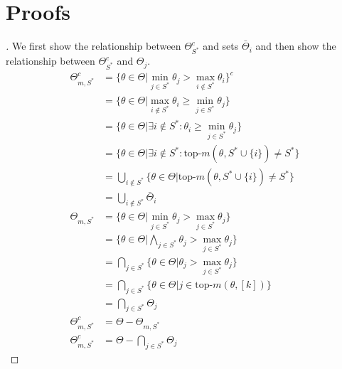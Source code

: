 \section{Proofs}\label{section:optimal_proofs}
\begin{proof}[]
  We first show the relationship between $\Theta_{S^*}^c$ and sets $\bar{\Theta}_i$ and then show the relationship between $\Theta_{S^*}^c$ and $\Theta_j$.
  \begin{align}
    \Theta_{m, S^*}^c &= \{\theta \in \Theta | \min_{j \in S^*} \theta_j > \max_{i \notin S^*} \theta_i \}^c \\
    &= \{\theta \in \Theta | \max_{i \notin S^*} \theta_i \geq \min_{j \in S^*} \theta_j\} \\
    &= \{\theta \in \Theta | \exists i \notin S^*: \theta_i \geq \min_{j \in S^*} \theta_j\} \\
    &= \{\theta \in \Theta | \exists i \notin S^*: \text{top-}m(\theta, S^* \cup \{i\}) \neq S^*\} \\
    &= \bigcup_{i \notin S^*} \{\theta \in \Theta | \text{top-}m(\theta, S^* \cup \{i\}) \neq S^*\} \\
    &= \bigcup_{i \notin S^*} \bar{\Theta}_i \\
    \Theta_{m, S^*} &= \{\theta \in \Theta | \min_{j \in S^*} \theta_j > \max_{j \in S^*} \theta_j\} \\
    &= \{\theta \in \Theta | \bigwedge_{j \in S^*} \theta_j > \max_{j \in S^*} \theta_j\} \\
    &= \bigcap_{j \in S^*} \{\theta \in \Theta | \theta_j > \max_{j \in S^*} \theta_j\} \\
    &= \bigcap_{j \in S^*} \{\theta \in \Theta | j \in \text{top-}m(\theta, [k])\} \\
    &= \bigcap_{j \in S^*} \Theta_j \\
    \Theta_{m, S^*}^c &= \Theta - \Theta_{m, S^*}\\
    \Theta_{m, S^*}^c &= \Theta - \bigcap_{j \in S^*} \Theta_j
  \end{align}
\end{proof}

